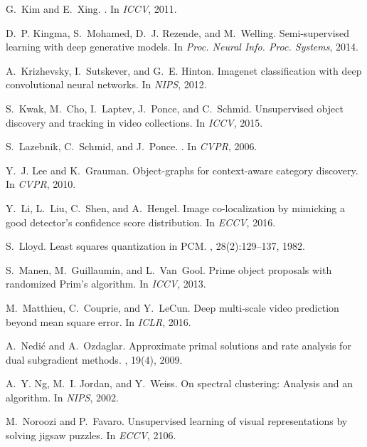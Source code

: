 \documentclass[10pt,twocolumn,letterpaper]{article}
\numberwithin{theorem}{section}
\begin{document}
\begin{thebibliography}{10}
G.~Kim and E.~Xing.
.
\newblock In {\em ICCV}, 2011.

D.~P. Kingma, S.~Mohamed, D.~J. Rezende, and M.~Welling.
\newblock Semi-supervised learning with deep generative models.
\newblock In {\em Proc. Neural Info. Proc. Systems}, 2014.

A.~Krizhevsky, I.~Sutskever, and G.~E. Hinton.
\newblock Imagenet classification with deep convolutional neural networks.
\newblock In {\em NIPS}, 2012.

S.~Kwak, M.~Cho, I.~Laptev, J.~Ponce, and C.~Schmid.
\newblock Unsupervised object discovery and tracking in video collections.
\newblock In {\em ICCV}, 2015.

S.~Lazebnik, C.~Schmid, and J.~Ponce.
.
\newblock In {\em CVPR}, 2006.

Y.~J. Lee and K.~Grauman.
\newblock Object-graphs for context-aware category discovery.
\newblock In {\em CVPR}, 2010.

Y.~Li, L.~Liu, C.~Shen, and A.~Hengel.
\newblock Image co-localization by mimicking a good detector's confidence score
  distribution.
\newblock In {\em ECCV}, 2016.

S.~Lloyd.
\newblock Least squares quantization in {PCM}.
, 28(2):129--137, 1982.

S.~Manen, M.~Guillaumin, and L.~Van~Gool.
\newblock Prime object proposals with randomized {P}rim's algorithm.
\newblock In {\em ICCV}, 2013.

M.~Matthieu, C.~Couprie, and Y.~LeCun.
\newblock Deep multi-scale video prediction beyond mean square error.
\newblock In {\em ICLR}, 2016.

A.~Nedi\'c and A.~Ozdaglar.
\newblock Approximate primal solutions and rate analysis for dual subgradient
  methods.
, 19(4), 2009.

A.~Y. Ng, M.~I. Jordan, and Y.~Weiss.
\newblock On spectral clustering: Analysis and an algorithm.
\newblock In {\em NIPS}, 2002.

M.~Noroozi and P.~Favaro.
\newblock Unsupervised learning of visual representations by solving jigsaw
  puzzles.
\newblock In {\em ECCV}, 2106.


\end{thebibliography}
\end{document}
